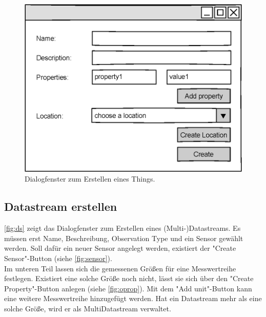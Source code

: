 \documentclass[a4paper, 12 pt]{article}
\begin{document}
\begin{figure}[htbp]
\centering
\includegraphics[scale=1]{images/thing}
\caption{\label{fig:thing}Dialogfenster zum Erstellen eines Things.}
\end{figure}


\subsection{Datastream erstellen}
\cref{fig:ds} zeigt das Dialogfenster zum Erstellen eines (Multi-)Datastreams. Es müssen erst Name, Beschreibung, Observation Type und ein Sensor gewählt werden. Soll dafür ein neuer Sensor angelegt werden, existiert der "{Create Sensor}"{-Button} (siehe \cref{fig:sensor}).\\

Im unteren Teil lassen sich die gemessenen Größen für eine Messwertreihe festlegen. Existiert eine solche Größe noch nicht, lässt sie sich über den "{Create Property}"{-Button} anlegen (siehe \cref{fig:oprop}). Mit dem "{Add unit}"{-Button} kann eine weitere Messwertreihe hinzugefügt werden. Hat ein Datastream mehr als eine solche Größe, wird er als MultiDatastream verwaltet.
\end{document}
